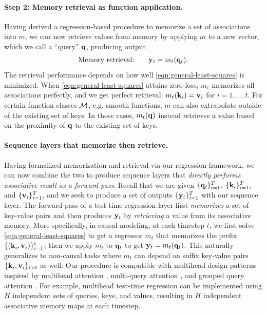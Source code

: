 \documentclass[notitlepage, 11pt]{article}
\newcommand*{\memory}{{m}}
\begin{document}
\paragraph{Step 2: Memory retrieval as function application.}
Having derived a regression-based procedure to memorize a set of associations into $\memory$, we can now retrieve values from memory by applying $\memory$ to a new vector, which we call a ``query'' $\mathbf{q}$, producing output
\begin{align}
    \text{Memory retrieval:} \quad \quad \ybf_t = \memory_t(\qbf_t). 
\end{align}
The retrieval performance depends on how well \autoref{eqn:general-least-squares} is minimized.
When \autoref{eqn:general-least-squares} attains zero-loss, $\memory_t$ memorizes all associations perfectly, and we get perfect retrieval: $\memory_t(\kbf_i) = \vbf_i$ for $i= 1, \ldots, t$.
For certain function classes $\mathcal{M}$, e.g. smooth functions, $\memory$ can also extrapolate outside of the existing set of keys.
In those cases, $\memory_t(\qbf)$ instead retrieves a value based on the proximity of $\mathbf{q}$ to the existing set of keys.

\paragraph{Sequence layers that memorize then retrieve.}
Having formalized memorization and retrieval via our regression framework, we can now combine the two to produce sequence layers that \emph{directly performs associative recall as a forward pass}.
Recall that we are given $\{\mathbf{q}_i\}_{i=1}^T$, $\{\mathbf{k}_i\}_{i=1}^T$, and $\{\mathbf{v}_i\}_{i=1}^T$, and we seek to produce a set of outputs $\{\mathbf{y}_i\}_{i=1}^T$ with our sequence layer.
The forward pass of a test-time regression layer first \emph{memorizes} a set of key-value pairs and then produces $\mathbf{y}_t$ by \emph{retrieving} a value from its associative memory.
More specifically, in causal modeling, at each timestep $t$, we first solve \autoref{eqn:general-least-squares} to get a regressor $\memory_t$ that memorizes the prefix $\{(\mathbf{k}_i, \mathbf{v}_i)\}_{i=1}^t$; then we apply $\memory_t$ to $\mathbf{q}_t$ to get $\ybf_t = \memory_t(\qbf_t)$.
This naturally generalizes to non-causal tasks where $\memory_t$ can depend on suffix key-value pairs $\{\mathbf{k}_i,\mathbf{v}_i\}_{i > t}$ as well.
Our procedure is compatible with multihead design patterns inspired by multihead attention \citep{Vaswani2017AttentionAllYou}, multi-query attention \citep{Shazeer2019FastTransformerDecoding}, and grouped query attention \citep{Ainslie2023GQATrainingGeneralized}.
For example, multihead test-time regression can be implemented using $H$ independent sets of queries, keys, and values, resulting in $H$ independent associative memory maps at each timestep.
\end{document}

